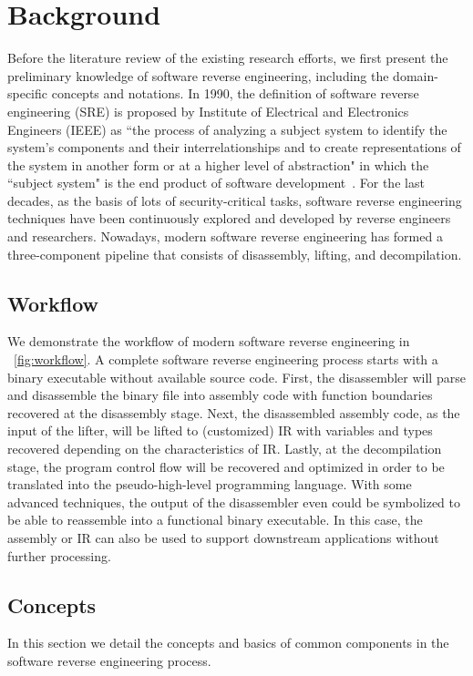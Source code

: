 \chapter{Background}\label{sec-background}

Before the literature review of the existing research efforts, we first present
the preliminary knowledge of software reverse engineering, including the
domain-specific concepts and notations. In 1990, the definition of software
reverse engineering (SRE) is proposed by Institute of Electrical and
Electronics Engineers (IEEE) as ``the process of analyzing a subject system to
identify the system's components and their interrelationships and to create
representations of the system in another form or at a higher level of
abstraction" in which the ``subject system" is the end product of software
development~\cite{ieee-sre}.
For the last decades, as the basis of lots of security-critical tasks, software
reverse engineering techniques have been continuously explored and developed by
reverse engineers and researchers. Nowadays, modern software reverse
engineering has formed a three-component pipeline that consists of disassembly,
lifting, and decompilation.


\section{Workflow} \label{sec:background-workflow}
We demonstrate the workflow of modern software reverse engineering in
\F~\ref{fig:workflow}. A complete software reverse engineering process starts
with a binary executable without available source code. First, the disassembler
will parse and disassemble the binary file into assembly code with function
boundaries recovered at the disassembly stage. Next, the disassembled assembly
code, as the input of the lifter, will be lifted to (customized) IR with
variables and types recovered depending on the characteristics of IR. Lastly,
at the decompilation stage, the program control flow will be recovered and
optimized in order to be translated into the pseudo-high-level programming
language. With some advanced techniques, the output of the disassembler even
could be symbolized to be able to reassemble into a functional binary
executable. In this case, the assembly or IR can also be used to support
downstream applications without further processing.

\section{Concepts} \label{sec:background-concepts}
In this section we detail the concepts and basics of common components in the
software reverse engineering process.

